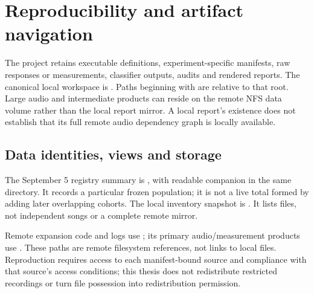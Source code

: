\appendix
\section{Reproducibility and artifact navigation}
\label{app:reproduction}
\begingroup\raggedright

The project retains executable definitions, experiment-specific manifests,
raw responses or measurements, classifier outputs, audits and rendered
reports. The canonical local workspace is
. Paths beginning with
 are relative to that root. Large audio and intermediate
products can reside on the remote NFS data volume rather than the local
report mirror. A local report's existence does not establish that its full
remote audio dependency graph is locally available.

\subsection{Data identities, views and storage}
The September 5 registry summary is
,
with readable companion  in the same directory.
It records a particular frozen population; it is not a live total formed by
adding later overlapping cohorts. The local inventory snapshot is
.
It lists files, not independent songs or a complete remote mirror.

Remote expansion code and logs use
;
its primary audio/measurement products use
.
These paths are remote filesystem references, not links to local files.
Reproduction requires access to each manifest-bound source and compliance
with that source's access conditions; this thesis does not redistribute
restricted recordings or turn file possession into redistribution permission.

